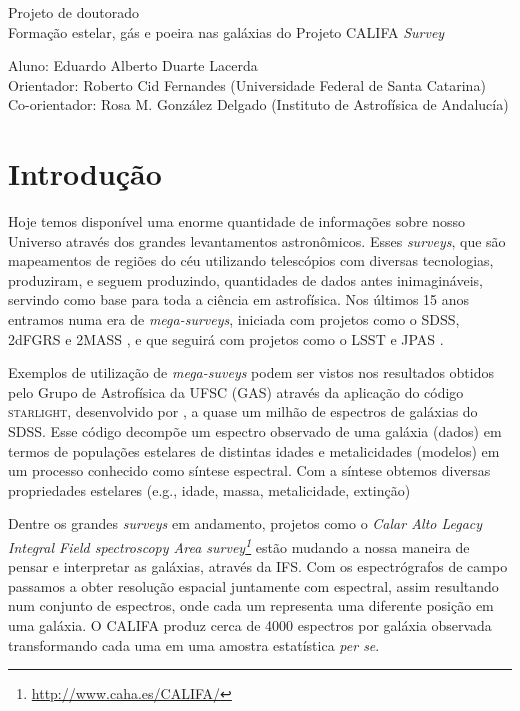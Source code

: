 \documentclass[a4paper,12pt]{article}
\def\starlight{\textsc{starlight}\xspace}      %
\def\SDSS{SDSS\xspace}           %
\begin{document}
\begin{center}
	\LARGE{Projeto de doutorado}\\ \bigskip\large{Formação estelar, gás e poeira nas galáxias do
	Projeto CALIFA {\em Survey}}
\end{center}

\vspace{1cm}

\begin{flushleft}
	Aluno: Eduardo Alberto Duarte Lacerda\\
	Orientador: Roberto Cid Fernandes (Universidade Federal de Santa Catarina)\\
	Co-orientador: Rosa M. González Delgado (Instituto de Astrofísica de Andalucía)
\end{flushleft}

\section{Introdução}
\vspace{0.3cm}

Hoje temos disponível uma enorme quantidade de informações sobre nosso Universo através dos grandes
levantamentos astronômicos. Esses {\em surveys}, que são mapeamentos de regiões do céu utilizando
telescópios com diversas tecnologias, produziram, e seguem produzindo, quantidades de dados antes
inimagináveis, servindo como base para toda a ciência em astrofísica. Nos últimos 15 anos entramos
numa era de {\em mega-surveys}, iniciada com projetos como o \SDSS \citep{York.etal.2000a}, 2dFGRS
\citep{Colless.1999a} e 2MASS \citep{Skrutskie.etal.2006a}, e que seguirá com projetos como o LSST
\citep{Ivezic.etal.2008a} e JPAS \citep{Benitez.etal.2014a}. 

Exemplos de utilização de {\em mega-suveys} podem ser vistos nos resultados obtidos pelo Grupo de
Astrofísica da UFSC (GAS) \citep[e.g., ][]{Asari.etal.2007a, ValeAsari.etal.2009a,
CidFernandes.etal.2007a, Mateus.etal.2006a} através da aplicação do código \starlight, desenvolvido
por \citet{CidFernandes.etal.2005a}, a quase um milhão de espectros de galáxias do \SDSS. Esse
código decompõe um espectro observado de uma galáxia (dados) em termos de populações estelares de
distintas idades e metalicidades (modelos) em um processo conhecido como síntese espectral. Com a
síntese obtemos diversas propriedades estelares (e.g., idade, massa, metalicidade, extinção)

Dentre os grandes {\em surveys} em andamento, projetos como o {\em Calar Alto Legacy Integral Field
spectroscopy Area survey\footnote{\url{http://www.caha.es/CALIFA/}}} \citep[CALIFA;
][]{Husemann.etal.2013a} estão mudando a nossa maneira de pensar e interpretar as galáxias, através
da IFS. Com os espectrógrafos de campo passamos a obter resolução espacial juntamente com espectral,
assim resultando num conjunto de espectros, onde cada um representa uma diferente posição em uma
galáxia. O CALIFA produz cerca de 4000 espectros por galáxia observada transformando cada uma em uma
amostra estatística {\em per se}.
\end{document}
